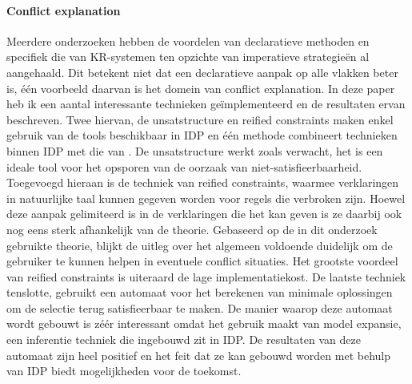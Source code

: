 \paragraph{Conflict explanation}
Meerdere onderzoeken hebben de voordelen van declaratieve methoden \cite{gelle1996interactive} en specifiek die van KR-systemen \cite{de2014predicate} \cite{denecker2008building} \cite{van2016kb} \cite{vlaeminck2009logical} ten opzichte van imperatieve strategie\"{e}n al aangehaald. Dit betekent niet dat een declaratieve aanpak op alle vlakken beter is, \'{e}\'{e}n voorbeeld daarvan is het domein van conflict explanation. In deze paper heb ik een aantal interessante technieken ge\"{i}mplementeerd en de resultaten ervan beschreven. Twee hiervan, de unsatstructure en reified constraints maken enkel gebruik van de tools beschikbaar in IDP en \'{e}\'{e}n methode combineert technieken binnen IDP met die van \cite{amilhastre2002consistency}. De unsatstructure werkt zoals verwacht, het is een ideale tool voor het opsporen van de oorzaak van niet-satisfieerbaarheid. Toegevoegd hieraan is de techniek van reified constraints, waarmee verklaringen in natuurlijke taal kunnen gegeven worden voor regels die verbroken zijn. Hoewel deze aanpak gelimiteerd is in de verklaringen die het kan geven is ze daarbij ook nog eens sterk afhankelijk van de theorie. Gebaseerd op de in dit onderzoek gebruikte theorie, blijkt de uitleg over het algemeen voldoende duidelijk om de gebruiker te kunnen helpen in eventuele conflict situaties. Het grootste voordeel van reified constraints is uiteraard de lage implementatiekost. De laatste techniek tenslotte, gebruikt een automaat voor het berekenen van minimale oplossingen om de selectie terug satisfieerbaar te maken. De manier waarop deze automaat wordt gebouwt is z\'{e}\'{e}r interessant omdat het gebruik maakt van model expansie, een inferentie techniek die ingebouwd zit in IDP. De resultaten van deze automaat zijn heel positief en het feit dat ze kan gebouwd worden met behulp van IDP biedt mogelijkheden voor de toekomst. 

